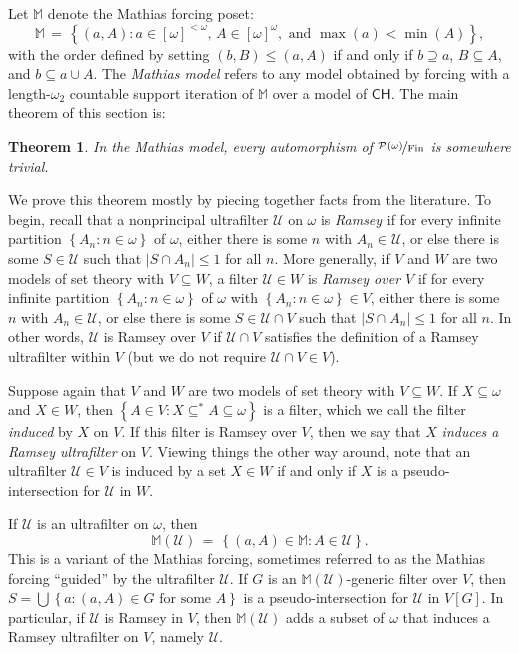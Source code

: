 \documentclass[11pt,leqno]{amsart}
\newtheorem{theorem}{Theorem}[section]
\theoremstyle{definition}
\theoremstyle{remark}
\newcommand{\U}{\mathcal{U}}
\newcommand{\explicitSet}[1]{\left\lbrace #1 \right\rbrace}
\newcommand{\set}[2]{\explicitSet{#1 \colon #2}}
\newcommand{\<}{\langle}
\renewcommand{\>}{\rangle}
\newcommand{\w}{\omega}
\newcommand{\0}{\emptyset}
\newcommand{\sub}{\subseteq}
\newcommand{\card}[1]{\left\lvert #1 \right\rvert}
\newcommand{\1}{1\hspace{-1.75mm}1}
\newcommand{\pwmf}{\nicefrac{\mathcal{P}(\w)}{\mathrm{Fin}}}
\newcommand{\ch}{\ensuremath{\mathsf{CH}}\xspace}
\newcommand{\M}{\mathbb{M}}
\begin{document}
Let $\M$ denote the Mathias forcing poset: 
$$\M \,=\, \set{(a,A)}{a \in [\w]^{<\w},\, A \in [\w]^\w, \text{ and }\max(a) < \min(A)},$$
with the order defined by setting $(b,B) \leq (a,A)$ if and only if $b \supseteq a$, $B \sub A$, and $b \sub a \cup A$. 
The \emph{Mathias model} refers to any model obtained by forcing with a length-$\w_2$ countable support iteration of $\M$ over a model of \ch. 
%
The main theorem of this section is: 

\begin{theorem}\label{thm:MathiasST}
In the Mathias model, every automorphism of $\pwmf$ is somewhere trivial. 
\end{theorem}

We prove this theorem mostly by piecing together facts from the literature. To begin, recall that 
a nonprincipal ultrafilter $\U$ on $\w$ is \emph{Ramsey} if for every infinite partition $\set{A_n}{n \in \w}$ of $\w$, either there is some $n$ with $A_n \in \U$, or else there is some $S \in \U$ such that $\card{S \cap A_n} \leq 1$ for all $n$. 
More generally, if $V$ and $W$ are two models of set theory with $V \sub W$, a filter $\U \in W$ is \emph{Ramsey over $V$} if for every infinite partition $\set{A_n}{n \in \w}$ of $\w$ with $\set{A_n}{n \in \w} \in V$, either there is some $n$ with $A_n \in \U$, or else there is some $S \in \U \cap V$ such that $\card{S \cap A_n} \leq 1$ for all $n$. In other words, $\U$ is Ramsey over $V$ if $\U \cap V$ satisfies the definition of a Ramsey ultrafilter within $V$ (but we do not require $\U \cap V \in V$). 

Suppose again that $V$ and $W$ are two models of set theory with $V \sub W$. 
If $X \sub \w$ and $X \in W$, then 
$\set{A \in V}{X \sub^* A \sub \w}$ 
is a filter, which we call the filter \emph{induced} by $X$ on $V$. 
If this filter is Ramsey over $V$, then we say that $X$ \emph{induces a Ramsey ultrafilter} on $V$. 
Viewing things the other way around, note that an ultrafilter $\U \in V$ is induced by a set $X \in W$ if and only if $X$ is a pseudo-intersection for $\U$ in $W$. 

If $\U$ is an ultrafilter on $\w$, then 
$$\M(\U) \,=\, \set{(a,A) \in \M}{A \in \U}.$$
This is a variant of the Mathias forcing, sometimes referred to as the Mathias forcing ``guided'' by the ultrafilter $\U$. 
If $G$ is an $\M(\U)$-generic filter over $V$, then $S = \textstyle \bigcup \set{a}{(a,A) \in G \text{ for some }A}$ 
is a pseudo-intersection for $\U$ in $V[G]$. %
In particular, if $\U$ is Ramsey in $V$, then $\M(\U)$ adds a subset of $\w$ that induces a Ramsey ultrafilter on $V$, namely $\U$. 
\end{document}
